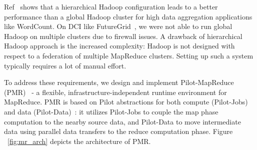 \documentclass[]{paper}
\begin{document}
Ref~\cite{weissman-mr-11} shows that a hierarchical Hadoop configuration leads to a better performance than a global Hadoop cluster for high data aggregation applications like WordCount. On DCI like FutureGrid~\cite{fg}, we were not able to run global Hadoop on multiple clusters due to firewall issues.  A drawback of hierarchical Hadoop approach is the increased complexity: Hadoop is not designed with respect to a federation of multiple MapReduce clusters. Setting up such a system typically requires a lot of manual effort.

To address these requirements, we design and implement Pilot-MapReduce (PMR)~\cite{pmr-2012} - a flexible, infrastructure-independent runtime environment for MapReduce. PMR is based on Pilot abstractions for both compute (Pilot-Jobs) and data (Pilot-Data)~\cite{pstar-2012}: it utilizes Pilot-Jobs to couple the map phase computation to the nearby source data, and Pilot-Data to move intermediate data using parallel data transfers to the reduce computation phase. Figure ~\ref{fig:mr_arch} depicts the architecture of PMR. 
\end{document}
